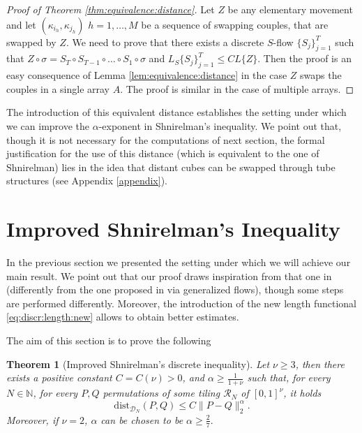 \documentclass[12 pt]{article}
\theoremstyle{definition} \newtheorem{definition}{Definition}[section]
\theoremstyle{definition} \newtheorem{remark}[definition]{Remark}
\theoremstyle{plain} \newtheorem{lemma}[definition]{Lemma}
\theoremstyle{plain} \newtheorem{proposition}[definition]{Proposition}
\theoremstyle{plain} \newtheorem{theorem}[definition]{Theorem}
\theoremstyle{plain} \newtheorem{corollary}[definition]{Corollary}
\theoremstyle{definition} \newtheorem{example}[definition]{Example}
\theoremstyle{definition} \newtheorem{assumption}[definition]{Assumption}
\theoremstyle{definition} \newtheorem{conjecture}[definition]{Conjecture}
\newcommand{\N}{\mathbb{N}}
\newcommand{\1}{\mathbbm 1}
\numberwithin{equation}{section}
\begin{document}
\begin{proof}[Proof of Theorem \ref{thm:equivalence:distance}]
    Let $Z$ be any elementary movement and let $(\kappa_{i_h},\kappa_{j_h})$ $h=1,\dots,M$ be a sequence of swapping couples, that are swapped by $Z$. We need to prove that there exists a discrete $S$-flow $\lbrace S_j\rbrace_{j=1}^T$ such that $Z\circ\sigma=S_T\circ S_{T-1}\circ\dots \circ S_1\circ \sigma$ and $L_S\lbrace S_j\rbrace_{j=1}^T\leq C L\lbrace Z\rbrace$. Then the proof is an easy consequence of Lemma \ref{lem:equivalence:distance} in the case $Z$ swaps the couples in a single array $A$. The proof is similar in the case of multiple arrays.
\end{proof}

The introduction of this equivalent distance establishes the setting under which we can improve the $\alpha$-exponent in Shnirelman's inequality. We point out that, though it is not necessary for the computations of next section, the formal justification for the use of this distance (which is equivalent to the one of Shnirelman) lies in the idea that distant cubes can be swapped through tube structures (see Appendix \ref{appendix}).


\section{Improved Shnirelman's Inequality}\label{S:improved:shnirelman}

In the previous section we presented the setting under which we will achieve our main result. We point out that our proof draws inspiration from that one in \cite{Shnirelman} (differently from the one proposed in \cite{Shnirelman2} via generalized flows), though some steps are performed differently. Moreover, the introduction of the new length functional \ref{eq:discr:length:new} allows to obtain better estimates.

\medskip

The aim of this section is to prove the following
\begin{theorem}[Improved Shnirelman's discrete inequality]\label{thm:ineq:discrete}
    Let $\nu\geq 3$, then there exists a positive constant $C=C(\nu)>0$, and $\alpha\geq \frac{1}{1+\nu}$ such that, for every $N\in\N$, for every $P,Q$ permutations of some tiling $\mathcal{R}_N$ of $[0,1]^\nu$, it holds
    \begin{equation}
        \text{dist}_{\mathcal{D}_N}(P,Q)\leq C\|P-Q\|_2^\alpha.
    \end{equation}
    Moreover, if $\nu=2$, $\alpha$ can be chosen to be $\alpha\geq\frac{2}{7}.$
\end{theorem}
\medskip
\end{document}
